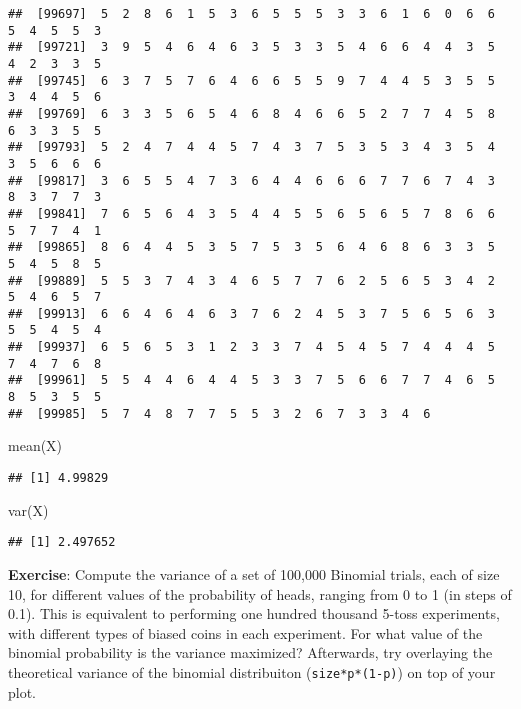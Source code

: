 \documentclass[
]{book}
\newenvironment{Shaded}{\begin{snugshade}}{\end{snugshade}}
\newcommand{\FunctionTok}[1]{\textcolor[rgb]{0.00,0.00,0.00}{#1}}
\newcommand{\NormalTok}[1]{#1}
\begin{document}
\begin{verbatim}
##  [99697]  5  2  8  6  1  5  3  6  5  5  5  3  3  6  1  6  0  6  6  5  4  5  5  3
##  [99721]  3  9  5  4  6  4  6  3  5  3  3  5  4  6  6  4  4  3  5  4  2  3  3  5
##  [99745]  6  3  7  5  7  6  4  6  6  5  5  9  7  4  4  5  3  5  5  3  4  4  5  6
##  [99769]  6  3  3  5  6  5  4  6  8  4  6  6  5  2  7  7  4  5  8  6  3  3  5  5
##  [99793]  5  2  4  7  4  4  5  7  4  3  7  5  3  5  3  4  3  5  4  3  5  6  6  6
##  [99817]  3  6  5  5  4  7  3  6  4  4  6  6  6  7  7  6  7  4  3  8  3  7  7  3
##  [99841]  7  6  5  6  4  3  5  4  4  5  5  6  5  6  5  7  8  6  6  5  7  7  4  1
##  [99865]  8  6  4  4  5  3  5  7  5  3  5  6  4  6  8  6  3  3  5  5  4  5  8  5
##  [99889]  5  5  3  7  4  3  4  6  5  7  7  6  2  5  6  5  3  4  2  5  4  6  5  7
##  [99913]  6  6  4  6  4  6  3  7  6  2  4  5  3  7  5  6  5  6  3  5  5  4  5  4
##  [99937]  6  5  6  5  3  1  2  3  3  7  4  5  4  5  7  4  4  4  5  7  4  7  6  8
##  [99961]  5  5  4  4  6  4  4  5  3  3  7  5  6  6  7  7  4  6  5  8  5  3  5  5
##  [99985]  5  7  4  8  7  7  5  5  3  2  6  7  3  3  4  6
\end{verbatim}

\begin{Shaded}
\begin{Highlighting}[]
\FunctionTok{mean}\NormalTok{(X)}
\end{Highlighting}
\end{Shaded}

\begin{verbatim}
## [1] 4.99829
\end{verbatim}

\begin{Shaded}
\begin{Highlighting}[]
\FunctionTok{var}\NormalTok{(X)}
\end{Highlighting}
\end{Shaded}

\begin{verbatim}
## [1] 2.497652
\end{verbatim}

\textbf{Exercise}: Compute the variance of a set of 100,000 Binomial trials, each of size 10, for different values of the probability of heads, ranging from 0 to 1 (in steps of 0.1). This is equivalent to performing one hundred thousand 5-toss experiments, with different types of biased coins in each experiment. For what value of the binomial probability is the variance maximized? Afterwards, try overlaying the theoretical variance of the binomial distribuiton (\texttt{size*p*(1-p)}) on top of your plot.
\end{document}
